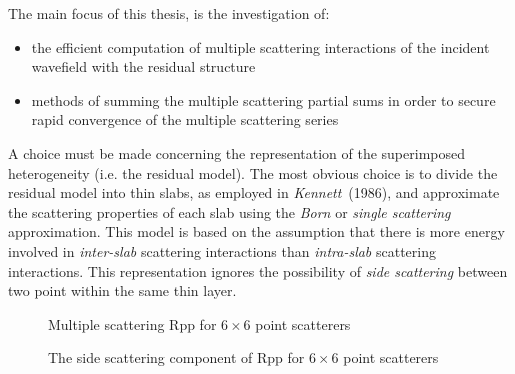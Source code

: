 The main focus of this thesis, is the investigation of:
\begin{itemize}
\item  the efficient computation of  multiple scattering interactions of the 
incident wavefield with the residual structure
\item  methods of summing the multiple scattering partial sums  in order to secure 
rapid convergence of the multiple scattering series
\end{itemize}
A choice must be made concerning the 
representation of the superimposed heterogeneity (i.e. the residual 
model). The most obvious choice is to divide the residual model into thin 
slabs, as employed in  {\em Kennett\/}~(1986), and approximate the scattering 
properties of each slab  using the {\em Born\/} or {\em single 
scattering\/} approximation. This model is based on the assumption that 
there is more energy involved in {\em inter-slab\/} scattering interactions than 
{\em intra-slab\/} scattering interactions. This representation ignores 
the possibility of {\em side scattering\/} between two point within the 
same thin layer.

\begin{figure}
\HideDisplacementBoxes
\centerline{}
\caption{Multiple scattering Rpp for $6\times 6$ point scatterers}
\protect\label{Rdpp}
\end{figure}
\begin{figure}
\HideDisplacementBoxes
\centerline{}
\caption{The side scattering component of Rpp for $6\times6$ point scatterers}
\protect\label{dRdpp}
\end{figure}

